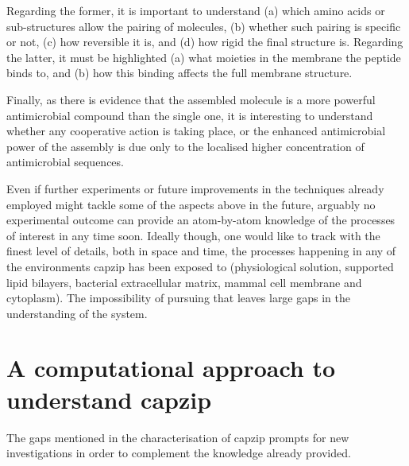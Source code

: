 Regarding the former, it is important to understand (a) which amino acids or sub-structures allow the pairing of molecules, (b) whether such pairing is specific or not, (c) how reversible it is, and (d) how rigid the final structure is.
%
Regarding the latter, it must be highlighted (a) what moieties in the membrane the peptide binds to, and (b) how this binding affects the full membrane structure.

Finally, as there is evidence that the assembled molecule is a more powerful antimicrobial compound than the single one, it is interesting to understand whether any cooperative action is taking place, or the enhanced antimicrobial power of the assembly is due only to the localised higher concentration of antimicrobial sequences.

Even if further experiments or future improvements in the techniques already employed might tackle some of the aspects above in the future, arguably no experimental outcome can provide an atom-by-atom knowledge of the processes of interest in any time soon. Ideally though, one would like to track with the finest level of details, both in space and time, the processes happening in any of the environments capzip has been exposed to (physiological solution, supported lipid bilayers, bacterial extracellular matrix, mammal cell membrane and cytoplasm). The impossibility of pursuing that leaves large gaps in the understanding of the system.


\section{A computational approach to understand capzip}

The gaps mentioned in the characterisation of capzip prompts for new investigations in order to complement the knowledge already provided.

